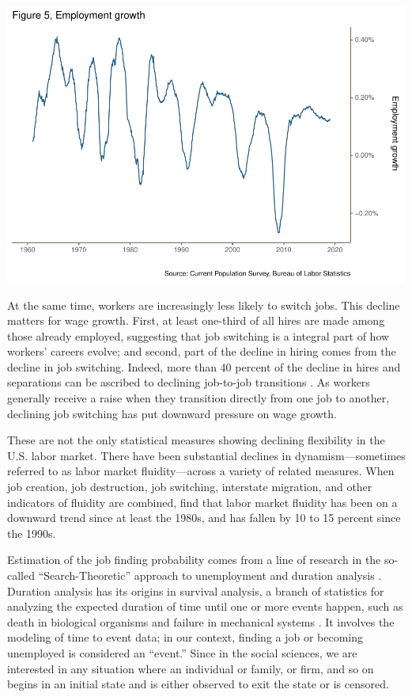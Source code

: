 \documentclass[
  11pt,
]{article}
\begin{document}
\begin{center}\includegraphics{JOLTS_files/figure-latex/unnamed-chunk-9-1} \end{center}

At the same time, workers are increasingly less likely to switch jobs.
This decline matters for wage growth. First, at least one-third of all
hires are made among those already employed, suggesting that job
switching is a integral part of how workers' careers evolve; and second,
part of the decline in hiring comes from the decline in job switching.
Indeed, more than 40 percent of the decline in hires and separations can
be ascribed to declining job-to-job transitions \citep{Hyatt13}. As
workers generally receive a raise when they transition directly from one
job to another, declining job switching has put downward pressure on
wage growth.

These are not the only statistical measures showing declining
flexibility in the U.S. labor market. There have been substantial
declines in dynamism---sometimes referred to as labor market
fluidity---across a variety of related measures. When job creation, job
destruction, job switching, interstate migration, and other indicators
of fluidity are combined, \cite{Molloy16} find that labor market
fluidity has been on a downward trend since at least the 1980s, and has
fallen by 10 to 15 percent since the 1990s.

Estimation of the job finding probability comes from a line of research
in the so-called ``Search-Theoretic'' approach to unemployment and
duration analysis \citep{Pissarides2000}. Duration analysis has its
origins in survival analysis, a branch of statistics for analyzing the
expected duration of time until one or more events happen, such as death
in biological organisms and failure in mechanical systems
\citep{Lanc90}. It involves the modeling of time to event data; in our
context, finding a job or becoming unemployed is considered an
``event.'' Since in the social sciences, we are interested in any
situation where an individual or family, or firm, and so on begins in an
initial state and is either observed to exit the state or is censored.
\end{document}
